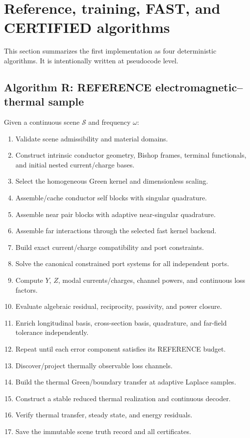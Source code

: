 \section{Reference, training, FAST, and CERTIFIED algorithms}
\label{sec:algorithms}

This section summarizes the first implementation as four deterministic
algorithms. It is intentionally written at pseudocode level.

\subsection{Algorithm R: REFERENCE electromagnetic--thermal sample}

Given a continuous scene $\mathcal S$ and frequency $\omega$:

\begin{enumerate}
\item Validate scene admissibility and material domains.
\item Construct intrinsic conductor geometry, Bishop frames, terminal
      functionals, and initial nested current/charge bases.
\item Select the homogeneous Green kernel and dimensionless scaling.
\item Assemble/cache conductor self blocks with singular quadrature.
\item Assemble near pair blocks with adaptive near-singular quadrature.
\item Assemble far interactions through the selected fast kernel backend.
\item Build exact current/charge compatibility and port constraints.
\item Solve the canonical constrained port systems for all independent ports.
\item Compute $Y$, $Z$, modal currents/charges, channel powers, and continuous
      loss factors.
\item Evaluate algebraic residual, reciprocity, passivity, and power closure.
\item Enrich longitudinal basis, cross-section basis, quadrature, and far-field
      tolerance independently.
\item Repeat until each error component satisfies its REFERENCE budget.
\item Discover/project thermally observable loss channels.
\item Build the thermal Green/boundary transfer at adaptive Laplace samples.
\item Construct a stable reduced thermal realization and continuous decoder.
\item Verify thermal transfer, steady state, and energy residuals.
\item Save the immutable scene truth record and all certificates.
\end{enumerate}

